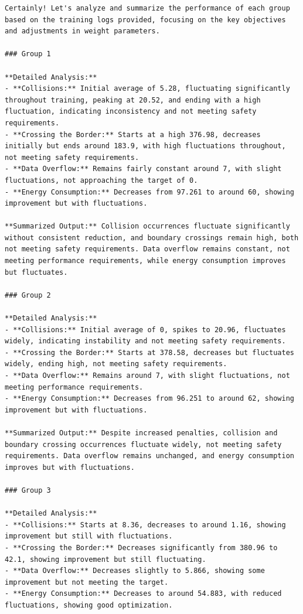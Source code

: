 \documentclass{article}
\begin{document}
\begin{verbatim}
Certainly! Let's analyze and summarize the performance of each group based on the training logs provided, focusing on the key objectives and adjustments in weight parameters.

### Group 1

**Detailed Analysis:**
- **Collisions:** Initial average of 5.28, fluctuating significantly throughout training, peaking at 20.52, and ending with a high fluctuation, indicating inconsistency and not meeting safety requirements.
- **Crossing the Border:** Starts at a high 376.98, decreases initially but ends around 183.9, with high fluctuations throughout, not meeting safety requirements.
- **Data Overflow:** Remains fairly constant around 7, with slight fluctuations, not approaching the target of 0.
- **Energy Consumption:** Decreases from 97.261 to around 60, showing improvement but with fluctuations.

**Summarized Output:** Collision occurrences fluctuate significantly without consistent reduction, and boundary crossings remain high, both not meeting safety requirements. Data overflow remains constant, not meeting performance requirements, while energy consumption improves but fluctuates.

### Group 2

**Detailed Analysis:**
- **Collisions:** Initial average of 0, spikes to 20.96, fluctuates widely, indicating instability and not meeting safety requirements.
- **Crossing the Border:** Starts at 378.58, decreases but fluctuates widely, ending high, not meeting safety requirements.
- **Data Overflow:** Remains around 7, with slight fluctuations, not meeting performance requirements.
- **Energy Consumption:** Decreases from 96.251 to around 62, showing improvement but with fluctuations.

**Summarized Output:** Despite increased penalties, collision and boundary crossing occurrences fluctuate widely, not meeting safety requirements. Data overflow remains unchanged, and energy consumption improves but with fluctuations.

### Group 3

**Detailed Analysis:**
- **Collisions:** Starts at 8.36, decreases to around 1.16, showing improvement but still with fluctuations.
- **Crossing the Border:** Decreases significantly from 380.96 to 42.1, showing improvement but still fluctuating.
- **Data Overflow:** Decreases slightly to 5.866, showing some improvement but not meeting the target.
- **Energy Consumption:** Decreases to around 54.883, with reduced fluctuations, showing good optimization.


\end{verbatim}
\end{document}
